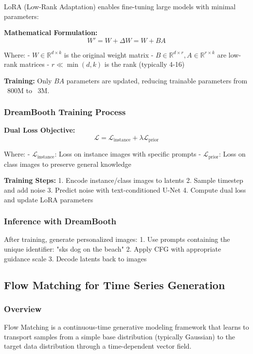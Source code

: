 \documentclass[a4paper,12pt]{article}
\begin{document}
LoRA (Low-Rank Adaptation) enables fine-tuning large models with minimal parameters:

\textbf{Mathematical Formulation:}
\[ W' = W + \Delta W = W + BA \]

Where:
- $W \in \mathbb{R}^{d \times k}$ is the original weight matrix
- $B \in \mathbb{R}^{d \times r}, A \in \mathbb{R}^{r \times k}$ are low-rank matrices
- $r \ll \min(d, k)$ is the rank (typically 4-16)

\textbf{Training:} Only $BA$ parameters are updated, reducing trainable parameters from ~800M to ~3M.

\subsubsection{DreamBooth Training Process}

\textbf{Dual Loss Objective:}
\[ \mathcal{L} = \mathcal{L}_\text{instance} + \lambda \mathcal{L}_\text{prior} \]

Where:
- $\mathcal{L}_\text{instance}$: Loss on instance images with specific prompts
- $\mathcal{L}_\text{prior}$: Loss on class images to preserve general knowledge

\textbf{Training Steps:}
1. Encode instance/class images to latents
2. Sample timestep and add noise
3. Predict noise with text-conditioned U-Net
4. Compute dual loss and update LoRA parameters

\subsubsection{Inference with DreamBooth}

After training, generate personalized images:
1. Use prompts containing the unique identifier: "sks dog on the beach"
2. Apply CFG with appropriate guidance scale
3. Decode latents back to images

\subsection{Flow Matching for Time Series Generation}

\subsubsection{Overview}

Flow Matching is a continuous-time generative modeling framework that learns to transport samples from a simple base distribution (typically Gaussian) to the target data distribution through a time-dependent vector field.
\end{document}
